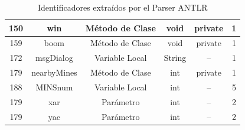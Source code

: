 \begin{table}
\begin{tabular}{| c | c | c | c | c | c | }
150&win&Método de Clase&void&private&1\\ \hline
159&boom&Método de Clase&void&private&1\\ \hline
172&msgDialog&Variable Local&String&--&1\\ \hline
179&nearbyMines&Método de Clase&int&private&1\\ \hline
188&MINSnum&Variable Local&int&--&5\\ \hline
179&xar&Parámetro&int&--&2\\ \hline
179&yac&Parámetro&int&--&2\\ \hline
   
   	\end{tabular}  
	 
   \caption{Identificadores extraídos por el Parser ANTLR}
   \label{tabla2}
     
\end{table} 


